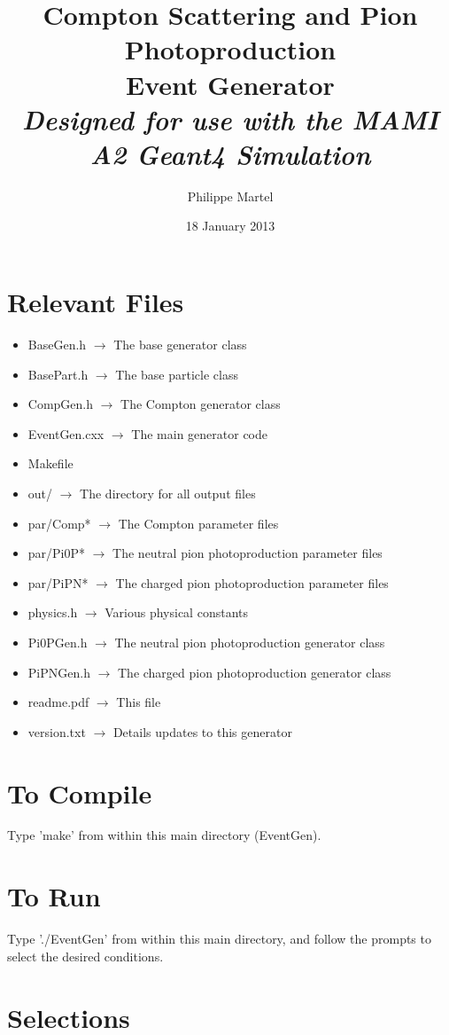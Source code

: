 \documentclass[twoside,letterpaper,12pt]{article}
\title{Compton Scattering and Pion Photoproduction\\Event Generator\\\vskip5mm\large\emph{Designed for use with the MAMI A2 Geant4 Simulation}}
\author{Philippe Martel}
\date{18 January 2013}
\begin{document}
\maketitle

\section{Relevant Files}
\begin{itemize}
\item BaseGen.h $\rightarrow$ The base generator class
\item BasePart.h $\rightarrow$ The base particle class
\item CompGen.h $\rightarrow$ The Compton generator class
\item EventGen.cxx $\rightarrow$ The main generator code
\item Makefile
\item out/ $\rightarrow$ The directory for all output files
\item par/Comp* $\rightarrow$ The Compton parameter files
\item par/Pi0P* $\rightarrow$ The neutral pion photoproduction parameter files
\item par/PiPN* $\rightarrow$ The charged pion photoproduction parameter files
\item physics.h $\rightarrow$ Various physical constants
\item Pi0PGen.h $\rightarrow$ The neutral pion photoproduction generator class
\item PiPNGen.h $\rightarrow$ The charged pion photoproduction generator class
\item readme.pdf $\rightarrow$ This file
\item version.txt $\rightarrow$ Details updates to this generator
\end{itemize}

\section{To Compile}
Type 'make' from within this main directory (EventGen).

\section{To Run}
Type './EventGen' from within this main directory, and follow the prompts to select the desired conditions.

\section{Selections}
\end{document}
